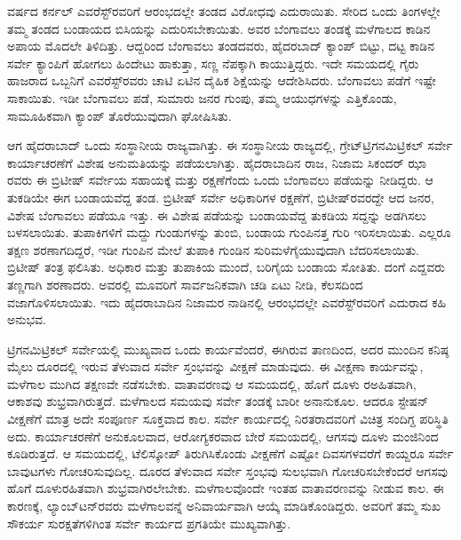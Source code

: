 \newpage

 ವರ್ಷದ ಕರ್ನಲ್​ ಎವರೆಸ್ಟ್​ರವರಿಗೆ ಆರಂಭದಲ್ಲೇ ತಂಡದ ವಿರೋಧವು ಎದು\break ರಾಯಿತು. ಸೇರಿದ ಒಂದು ತಿಂಗಳಲ್ಲೇ ತಮ್ಮ ತಂಡದ ಬಂಡಾಯದ ಬಿಸಿಯನ್ನು ಎದುರಿಸಬೇಕಾಯಿತು. ಅವರ ಬೆಂಗಾವಲು ತಂಡಕ್ಕೆ ಮಳೆಗಾಲದ ಕಾಡಿನ ಅಪಾಯ ಮೊದಲೇ ತಿಳಿದಿತ್ತು. ಆದ್ದರಿಂದ ಬೆಂಗಾವಲು ತಂಡದವರು, ಹೈದರಬಾದ್​ ಕ್ಯಾಂಪ್​ ಬಿಟ್ಟು, ದಟ್ಟ ಕಾಡಿನ ಸರ್ವೇ ಕ್ಯಾಂಪಿಗೆ ಹೋಗಲು ಹಿಂದೇಟು ಹಾಕುತ್ತಾ, ಸಣ್ಣ ನೆಪಕ್ಕಾಗಿ ಕಾಯುತ್ತಿದ್ದರು. ಇದೇ ಸಮಯದಲ್ಲಿ ಗೈರು ಹಾಜರಾದ ಒಬ್ಬನಿಗೆ ಎವರೆಸ್ಟ್​ರವರು ಚಾಟಿ ಏಟಿನ ದೈಹಿಕ ಶಿಕ್ಷೆಯನ್ನು ಆದೇಶಿಸಿದರು. ಬೆಂಗಾವಲು ಪಡೆಗೆ ಇಷ್ಟೇ ಸಾಕಾಯಿತು. ಇಡೀ ಬೆಂಗಾವಲು ಪಡೆ, ಸುಮಾರು  ಜನರ ಗುಂಪು, ತಮ್ಮ ಆಯುಧಗಳನ್ನು ಎತ್ತಿಕೊಂಡು, ಸಾಮೂಹಿಕವಾಗಿ ಕ್ಯಾಂಪ್​ ತೊರೆಯುವುದಾಗಿ ಘೋಷಿಸಿತು.

ಆಗ ಹೈದರಾಬಾದ್​ ಒಂದು ಸಂಸ್ಥಾನೀಯ ರಾಜ್ಯವಾಗಿತ್ತು. ಈ ಸಂಸ್ಥಾನೀಯ ರಾಜ್ಯದಲ್ಲಿ, ಗ್ರೇಟ್​ ಟ್ರಿಗನಮಿಟ್ರಿಕಲ್​ ಸರ್ವೇ ಕಾರ್ಯಾಚರಣೆಗೆ ವಿಶೇಷ ಅನುಮತಿಯನ್ನು ಪಡೆಯಲಾಗಿತ್ತು. ಹೈದರಾಬಾದಿನ ರಾಜ, ನಿಜಾಮ ಸಿಕಂದರ್​ ಝಾ ರವರು ಈ ಬ್ರಿಟೀಷ್​ ಸರ್ವೇಯ ಸಹಾಯಕ್ಕೆ ಮತ್ತು ರಕ್ಷಣೆಗೆಂದು ಒಂದು ಬೆಂಗಾವಲು ಪಡೆಯನ್ನು ನೀಡಿದ್ದರು. ಆ ತುಕಡಿಯೇ ಈಗ ಬಂಡಾಯವೆದ್ದ ತಂಡ. ಬ್ರಿಟೀಷ್​ ಸರ್ವೇ ಅಧಿಕಾರಿಗಳ ರಕ್ಷಣೆಗೆ, ಬ್ರಿಟೀಷ್​ರವರದ್ದೇ ಆದ  ಜನರ, ವಿಶೇಷ ಬೆಂಗಾವಲು ಪಡೆಯೂ ಇತ್ತು. ಈ ವಿಶೇಷ ಪಡೆಯನ್ನು ಬಂಡಾಯವೆದ್ದ ತುಕಡಿಯ ಸದ್ದನ್ನು ಅಡಗಿಸಲು ಬಳಸಲಾಯಿತು. ತುಪಾಕಿಗಳಿಗೆ ಮದ್ದು ಗುಂಡುಗಳನ್ನು ತುಂಬಿ, ಬಂಡಾಯ ಗುಂಪಿನತ್ತ ಗುರಿ ಇರಿಸಲಾಯಿತು. ಎಲ್ಲರೂ ತಕ್ಷಣ ಶರಣಾಗದಿದ್ದರೆ, ಇಡೀ ಗುಂಪಿನ ಮೇಲೆ ತುಪಾಕಿ ಗುಂಡಿನ ಸುರಿಮಳೆಗೈಯುವುದಾಗಿ ಬೆದರಿಸಲಾಯಿತು. ಬ್ರಿಟೀಷ್​ ತಂತ್ರ ಫಲಿಸಿತು. ಅಧಿಕಾರ ಮತ್ತು ತುಪಾಕಿಯ ಮುಂದೆ, ಬರಿಗೈಯ ಬಂಡಾಯ ಸೋತಿತು. ದಂಗೆ ಎದ್ದವರು ತಣ್ಣಗಾಗಿ ಶರಣಾದರು. ಅವರಲ್ಲಿ ಮೂವರಿಗೆ ಸಾರ್ವಜನಿಕವಾಗಿ ಚಡಿ ಏಟು ನೀಡಿ, ಕೆಲಸದಿಂದ ವಜಾಗೊಳಿಸಲಾಯಿತು. ಇದು ಹೈದರಾಬಾದಿನ ನಿಜಾಮರ ನಾಡಿನಲ್ಲಿ ಆರಂಭದಲ್ಲೇ ಎವರೆಸ್ಟ್​ರವರಿಗೆ ಎದುರಾದ ಕಹಿ ಅನುಭವ.

ಟ್ರಿಗನಮಿಟ್ರಿಕಲ್​ ಸರ್ವೇಯಲ್ಲಿ ಮುಖ್ಯವಾದ ಒಂದು ಕಾರ್ಯವೆಂದರೆ, ಈಗಿರುವ ತಾಣದಿಂದ, ಅದರ ಮುಂದಿನ ಕನಿಷ್ಠ  ಮೈಲು ದೂರದಲ್ಲಿ ಇರುವ ತೆಳುವಾದ ಸರ್ವೇ ಸ್ತಂಭವನ್ನು ವೀಕ್ಷಣೆ ಮಾಡುವುದು. ಈ ವೀಕ್ಷಣಾ ಕಾರ್ಯವನ್ನು, ಮಳೆಗಾಲ ಮುಗಿದ ತಕ್ಷಣವೇ ನಡೆಸಬೇಕು. ವಾತಾವರಣವು ಆ ಸಮಯದಲ್ಲಿ, ಹೊಗೆ ದೂಳು ರಅಹಿತವಾಗಿ, ಆಕಾಶವು ಶುಭ್ರವಾಗಿರುತ್ತದೆ. ಮಳೆಗಾಲದ ಸಮಯವು ಸರ್ವೇ ತಂಡಕ್ಕೆ ಬಾರೀ ಅನಾನುಕೂಲ. ಆದರೂ ಸ್ಟೇಷನ್​ ವೀಕ್ಷಣೆಗೆ ಮಾತ್ರ ಅದೇ ಸಂಪೂರ್ಣ ಸೂಕ್ತವಾದ ಕಾಲ. ಸರ್ವೇ ಕಾರ್ಯದಲ್ಲಿ ನಿರತರಾದವರಿಗೆ ವಿಚಿತ್ರ ಸಂದಿಗ್ದ ಪರಿಸ್ಥಿತಿ ಅದು. ಕಾರ್ಯಾಚರಣೆಗೆ ಅನುಕೂಲವಾದ, ಆರೋಗ್ಯಕರವಾದ ಬೇರೆ ಸಮಯದಲ್ಲಿ, ಆಗಸವು ದೂಳು ಮಂಜಿನಿಂದ ಕೂಡಿರುತ್ತದೆ. ಆ ಸಮಯದಲ್ಲಿ, ಟೆಲಿಸ್ಕೋಪ್​ ತಿರುಗಿಸಿಕೊಂಡು ವೀಕ್ಷಣೆಗೆ ಎಷ್ಟೋ ದಿವಸಗಳವರೆಗೆ ಕಾಯ್ದರೂ ಸರ್ವೇ ಬಾವುಟಗಳು ಗೋಚರಿಸುವುದಿಲ್ಲ. ದೂರದ ತೆಳುವಾದ ಸರ್ವೇ ಸ್ತಂಭವು ಸುಲಭವಾಗಿ ಗೋಚರಿಸಬೇಕೆಂದರೆ ಆಗಸವು ಹೊಗೆ ದೂಳುರಹಿತವಾಗಿ ಶುಭ್ರವಾಗಿರಲೇಬೇಕು. ಮಳೆಗಾಲವೊಂದೇ ಇಂತಹ ವಾತಾವರಣವನ್ನು ನೀಡುವ ಕಾಲ. ಈ ಕಾರಣಕ್ಕೆ, ಲ್ಯಾಂಬ್​ಟನ್​ರವರು ಮಳೆಗಾಲವನ್ನೆ ಅನಿವಾರ್ಯವಾಗಿ ಆಯ್ಕೆ ಮಾಡಿಕೊಂಡಿದ್ದರು. ಅವರಿಗೆ ತಮ್ಮ ಸುಖ ಸೌಕರ್ಯ ಸುರಕ್ಷತೆಗಳಿಗಿಂತ ಸರ್ವೇ ಕಾರ್ಯದ ಪ್ರಗತಿಯೇ ಮುಖ್ಯವಾಗಿತ್ತು.

